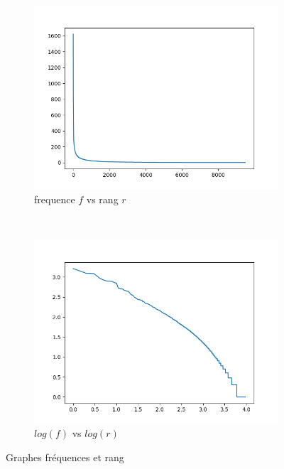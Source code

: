 \documentclass[12pt,a4paper]{article}
\begin{document}
\begin{figure}[htbp]
\centering
\begin{subfigure}[b]{0.45\textwidth}
	\centering \includegraphics[width=\textwidth]{freq_vs_rg_CACM.png}
	\caption{frequence $f$ vs rang $r$}
	\label{fig:CACM_fvsr}
	\end{subfigure}
~
\begin{subfigure}[b]{0.45\textwidth}
	\centering \includegraphics[width=\textwidth]{logFreq_vs_logRg_CACM.png}
	\caption{$log(f)$ vs $log(r)$}
	\label{fig:CACM_logfvslogr}
	\end{subfigure}
\caption{Graphes fréquences et rang}
\end{figure}
\end{document}
